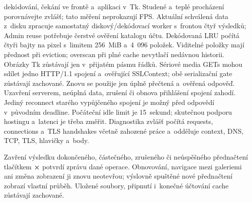 \documentclass[11pt,a4paper]{article}
\newcommand{\ui}[1]{\textbf{#1}}
\begin{document}
dekódování, čekání ve frontě a~aplikaci v~Tk. Studené a~teplé procházení
porovnávejte zvlášť; tato měření neprokazují FPS.
Aktuální schválená data z~disku zpracuje samostatný diskový/dekódovací worker
s~frontou čtyř výsledků; Admin reuse potřebuje čerstvé ověření katalogu účtu.
Dekódovaná LRU počítá čtyři bajty na pixel s~limitem 256~MiB a~4~096 položek.
Viditelné položky mají přednost při eviction; overscan při plné cache
nevytlačí nedávnou historii. Obrázky Tk zůstávají jen v~přijatém pásmu řádků.
Sériové media GETs mohou sdílet jedno HTTP/1.1 spojení a~ověřující SSLContext;
obě serializační gate zůstávají zachované. Znovu se použije jen úplně přečtená
a~ověřená odpověď. Uzavření serverem, neúplná data, zrušení či obnova
přihlášení spojení zahodí. Jediný reconnect starého vypůjčeného spojení
je možný před odpovědí v~původním deadline. Počáteční idle limit je
15~sekund; skutečnou podporu hostingu a~latenci je třeba změřit.
Diagnostika zvlášť počítá requests, connections a~TLS handshakes včetně
zahozené práce a~odděluje context, DNS, TCP, TLS, hlavičky a~body.

Zavření výsledku dokončeného, částečného, zrušeného či neúspěšného přednačtení tlačítkem
\ui{×} potvrdí zprávu dané operace. Obnovování, navigace mezi galeriemi ani změna
zobrazení ji znovu neotevřou; výslovně spuštěné nové přednačtení zobrazí vlastní
průběh. Uložené soubory, připnutí i~konečné účtování cache zůstávají zachované.
\end{document}

